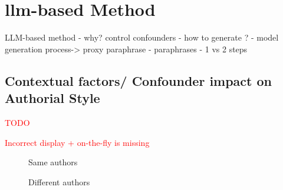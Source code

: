 \chapter{\acs{llm}-based \imp{} Method}
\label{chap:llm_impostor_method}
    LLM-based \imp{} method
    - why? control confounders
    - how to generate \imps{}? 
        - model generation process-> proxy paraphrase
        - paraphrases
        - 1 vs 2 steps

\section{Contextual factors/ Confounder impact on Authorial Style}
\label{sec:contextual_factors}
\textcolor{red}{TODO}



\textcolor{red}{Incorrect display + on-the-fly is missing}
\begin{figure}[htbp]
  \centering
  \begin{subfigure}[b]{0.45\textwidth}
    \centering
    
    \caption{\dataBlog{}}
    \label{fig:blog_same_author}
  \end{subfigure}
  \hfill
  \begin{subfigure}[b]{0.45\textwidth}
    \centering
    
    \caption{\dataStudent{}}
    \label{fig:student_essays_same_author}
  \end{subfigure}
  \caption{Same authors}
  \label{fig:same_authors}
\end{figure}


\begin{figure}[htbp]
  \centering
  \begin{subfigure}[b]{0.45\textwidth}
    \centering
    
    \caption{\dataBlog{}}
    \label{fig:blog_different_author}
  \end{subfigure}
  \hfill
  \begin{subfigure}[b]{0.45\textwidth}
    \centering
    
    \caption{\dataStudent{}}
    \label{fig:student_essays_different_author}
  \end{subfigure}
  \caption{Different authors}
  \label{fig:different_authors}
\end{figure}

